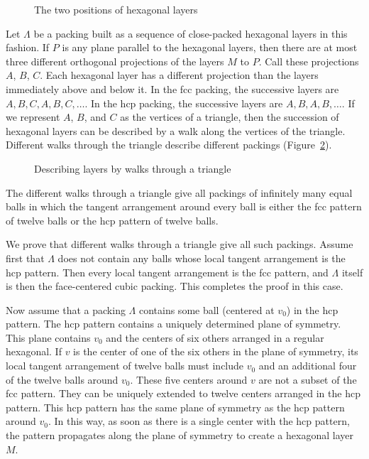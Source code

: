 \begin{figure}[htb]
  \centering
  \caption{The two positions of hexagonal layers}
  \label{fig:two-holes}
\end{figure}

Let $\Lambda$ be a packing built as a sequence of close-packed
hexagonal layers in this fashion.  If $P$ is any plane parallel to
the hexagonal layers, then there are at most three different
orthogonal projections of the layers $M$ to $P$.  Call these
projections $A$, $B$, $C$.  Each hexagonal layer has a different
projection than the layers immediately above and below it.  In the
fcc packing, the successive layers are $A,B,C,A,B,C,\ldots$.  In
the hcp packing, the successive layers are $A,B,A,B,\ldots$.  If
we represent $A$, $B$, and $C$ as the vertices of a triangle, then
the succession of hexagonal layers can be described by a walk
along the vertices of the triangle. Different walks through the
triangle describe different packings (Figure~\ref{fig:fcc-tri}).

\begin{figure}[htb]
  \centering
  \caption{Describing layers by walks through a triangle}
  \label{fig:fcc-tri}
\end{figure}


The different walks through a triangle give all packings of
infinitely many equal balls in which the tangent arrangement around
every ball is either the fcc pattern of twelve balls or the hcp
pattern of twelve balls.



We prove that different walks through a triangle give all
such packings. Assume first 
that $\Lambda$ does not contain any balls whose local
tangent arrangement is the hcp pattern.  Then every local tangent
arrangement is the fcc pattern, and $\Lambda$ itself is then the
face-centered cubic packing.  This completes the proof in this case.

Now assume that a packing $\Lambda$ contains some ball
(centered at $v_0$) in the hcp pattern. The hcp pattern contains a
uniquely determined plane of symmetry. This plane contains $v_0$ and
the centers of six others arranged in a regular hexagonal. If $v$ is
the center of one of the six others in the plane of symmetry, its
local tangent arrangement of twelve balls must include $v_0$ and an
additional four of the twelve balls around $v_0$. These five centers
around $v$ are not a subset of the fcc pattern. They can be uniquely
extended to twelve centers arranged in the hcp pattern. This hcp
pattern has the same plane of symmetry as the hcp pattern around
$v_0$. In this way, as soon as there is a single center with the hcp
pattern, the pattern propagates along the plane of symmetry to
create a hexagonal layer $M$.

